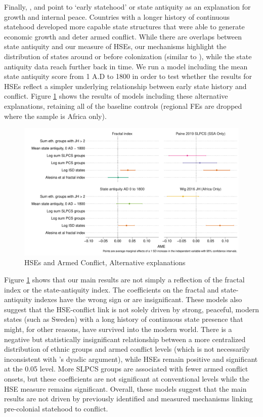 Finally, \citet{Putterman2008, Hariri2012}, and \citet{Bockstette2012} point to
`early statehood' or state antiquity as an explanation for growth and internal
peace. Countries with a longer history of continuous statehood developed more
capable state structures that were able to generate economic growth and deter
armed conflict. While there are overlaps between state antiquity and our measure
of HSEs, our mechanisms highlight the distribution of states around or before
colonization (similar to \citet{Paine2019}), while the state antiquity data
reach further back in time. We run a model including the mean state antiquity
score from 1 A.D to 1800 in order to test whether the results for HSEs reflect a
simpler underlying relationship between early state history and conflict. Figure
\ref{Fig: SH_Margins} shows the results of models including these alternative
explanations, retaining all of the baseline controls (regional FEs are dropped
where the sample is Africa only). 

\begin{figure}[!htb]
	\includegraphics[width=\textwidth]{img/margins_state_history.pdf}
	\caption{HSEs and Armed Conflict, Alternative explanations}
	\label{Fig: SH_Margins} 
\end{figure}

Figure \ref{Fig: SH_Margins} shows that our main results are not simply a
reflection of the fractal index or the state-antiquity index. The coefficients
on the fractal and state-antiquity indexes have the wrong sign or are
insignificant. These models also suggest that the HSE-conflict link is not
solely driven by strong, peaceful, modern states (such as Sweden) with a long
history of continuous state presence that might, for other reasons, have
survived into the modern world.  There is a negative but statistically
insignificant relationship between a more centralized distribution of ethnic
groups and armed conflict levels (which is not necessarily inconsistent with
\citet{Wig2016}'s dyadic argument), while HSEs remain positive and significant
at the 0.05 level. More SLPCS groups are associated with fewer armed conflict
onsets, but these coefficients are not significant at conventional levels while
the HSE measure remains significant. Overall, these models suggest that the main
results are not driven by previously identified and measured mechanisms linking
pre-colonial statehood to conflict.


